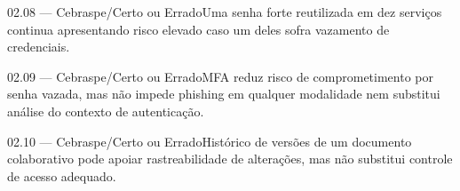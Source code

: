 \begin{questao}{ 02.08 — Cebraspe/Certo ou Errado}Uma senha forte reutilizada em dez serviços continua apresentando risco elevado caso um deles sofra vazamento de credenciais.\end{questao}
\begin{questao}{ 02.09 — Cebraspe/Certo ou Errado}MFA reduz risco de comprometimento por senha vazada, mas não impede phishing em qualquer modalidade nem substitui análise do contexto de autenticação.\end{questao}
\begin{questao}{ 02.10 — Cebraspe/Certo ou Errado}Histórico de versões de um documento colaborativo pode apoiar rastreabilidade de alterações, mas não substitui controle de acesso adequado.\end{questao}

